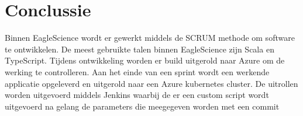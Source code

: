 \section{Conclussie}
Binnen EagleScience wordt er gewerkt middels de SCRUM methode om software te ontwikkelen. De meest gebruikte talen binnen EagleScience zijn Scala en TypeScript. Tijdens ontwikkeling worden er build uitgerold naar Azure om de werking te controlleren. Aan het einde van een sprint wordt een werkende applicatie opgeleverd en uitgerold naar een Azure kubernetes cluster. De uitrollen worden uitgevoerd middels Jenkins waarbij de er een custom script wordt uitgevoerd na gelang de parameters die meegegeven worden met een commit
